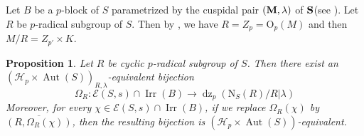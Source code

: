 \documentclass[11pt,a4paper]{article}
\numberwithin{equation}{section}
\newtheorem{proposition}[theorem]{Proposition}
\theoremstyle{definition}
\theoremstyle{remark}
\newcommand{\Irr}{\operatorname{Irr}}
\newcommand{\Aut}{\operatorname{Aut}}
\newcommand{\dz}{\operatorname{dz}}
\newcommand{\OO}{\mathrm{O}}
\newcommand{\HH}{\mathcal H}
\newcommand{\NN}{\mathrm N}
\begin{document}
Let $B$ be a $p$-block of $S$ parametrized by the cuspidal pair $({\bf M},\lambda)$ of $\bf S$(see \cite[Section 3]{Malle}). Let $R$ be \(p\)-radical subgroup of $S$. Then by \cite[Corollary 3.2 and Remark 2.5]{Malle}, we have $R=Z_p=\OO_p(M)$ and then $M/R=Z_{p'}\times K$.
\begin{proposition}\label{bij: rank-one}
Let $R$ be cyclic \(p\)-radical subgroup of $S$. Then there exist an $(\HH_p\times \Aut(S))_{R,\lambda}$-equivalent bijection
\begin{equation}
\Omega_R:
\mathcal{E}(S,s)\cap\Irr(B)\longrightarrow \dz_p(\NN_S(R)/R|\lambda) 
\end{equation}
Moreover, for every \(\chi\in\mathcal{E}(S,s)\cap\Irr(B)\), if we replace $\Omega_R(\chi)$ by $\overline{(R,\Omega_R(\chi))}$, then the resulting bijection is $(\HH_p\times \Aut(S))$-equivalent.
\end{proposition}
\end{document}
